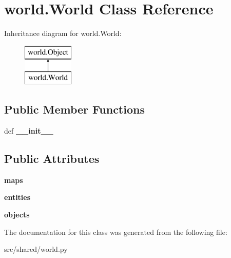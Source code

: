 \hypertarget{classworld_1_1_world}{\section{world.\-World \-Class \-Reference}
\label{classworld_1_1_world}
}
\-Inheritance diagram for world.\-World\-:\begin{figure}[H]
\begin{center}
\leavevmode
\includegraphics[height=2.000000cm]{classworld_1_1_world}
\end{center}
\end{figure}
\subsection*{\-Public \-Member \-Functions}
\begin{DoxyCompactItemize}
\item 
\hypertarget{classworld_1_1_world_a4351253668240be9d3a0d5bc2f1aa18f}{def {\bfseries \-\_\-\-\_\-init\-\_\-\-\_\-}}\label{classworld_1_1_world_a4351253668240be9d3a0d5bc2f1aa18f}

\end{DoxyCompactItemize}
\subsection*{\-Public \-Attributes}
\begin{DoxyCompactItemize}
\item 
\hypertarget{classworld_1_1_world_ae5d81046b959889536deca60b2df94a4}{{\bfseries maps}}\label{classworld_1_1_world_ae5d81046b959889536deca60b2df94a4}

\item 
\hypertarget{classworld_1_1_world_ae2c39feccf4fcd06f11f8398e42505a4}{{\bfseries entities}}\label{classworld_1_1_world_ae2c39feccf4fcd06f11f8398e42505a4}

\item 
\hypertarget{classworld_1_1_world_a144e6d2a815857b12be4cd2bf4ac2c44}{{\bfseries objects}}\label{classworld_1_1_world_a144e6d2a815857b12be4cd2bf4ac2c44}

\end{DoxyCompactItemize}


\-The documentation for this class was generated from the following file\-:\begin{DoxyCompactItemize}
\item 
src/shared/world.\-py\end{DoxyCompactItemize}
